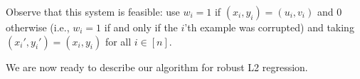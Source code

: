 



Observe that this system is feasible: use $w_i = 1$ if $(x_i,y_i) = (u_i, v_i)$ and $0$ otherwise (i.e., $w_i = 1$ if and only if the $i$'th example was corrupted) and taking $(x_i', y_i') = (x_i,y_i)$ for all $i \in [n]$. 


We are now ready to describe our algorithm for robust L2 regression. 

